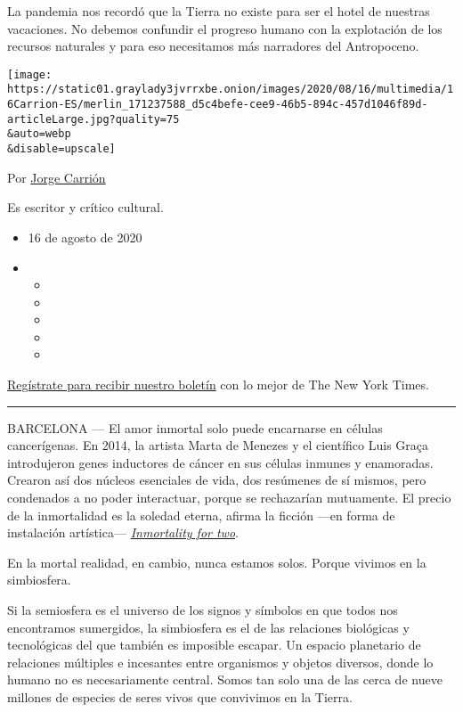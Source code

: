 La pandemia nos recordó que la Tierra no existe para ser el hotel de
nuestras vacaciones. No debemos confundir el progreso humano con la
explotación de los recursos naturales y para eso necesitamos más
narradores del Antropoceno.

\texttt{[image: https://static01.graylady3jvrrxbe.onion/images/2020/08/16/multimedia/16Carrion-ES/merlin\_171237588\_d5c4befe-cee9-46b5-894c-457d1046f89d-articleLarge.jpg?quality=75\\\&auto=webp\\\&disable=upscale]}

Por \href{https://www.nytimes3xbfgragh.onion/by/jorge-carrion}{Jorge
Carrión}

Es escritor y crítico cultural.

\begin{itemize}
\item
  16 de agosto de 2020
\item
  \begin{itemize}
  \item
  \item
  \item
  \item
  \item
  \end{itemize}
\end{itemize}

\href{https://www.nytimes3xbfgragh.onion/newsletters/el-times}{Regístrate
para recibir nuestro boletín} con lo mejor de The New York Times.

\begin{center}\rule{0.5\linewidth}{\linethickness}\end{center}

BARCELONA --- El amor inmortal solo puede encarnarse en células
cancerígenas. En 2014, la artista Marta de Menezes y el científico Luis
Graça introdujeron genes inductores de cáncer en sus células inmunes y
enamoradas. Crearon así dos núcleos esenciales de vida, dos resúmenes de
sí mismos, pero condenados a no poder interactuar, porque se rechazarían
mutuamente. El precio de la inmortalidad es la soledad eterna, afirma la
ficción ---en forma de instalación artística---
\href{https://martademenezes.com/portfolio/immortality-for-two/}{\emph{Inmortality
for two}}.

En la mortal realidad, en cambio, nunca estamos solos. Porque vivimos en
la simbiosfera.

Si la semiosfera es el universo de los signos y símbolos en que todos
nos encontramos sumergidos, la simbiosfera es el de las relaciones
biológicas y tecnológicas del que también es imposible escapar. Un
espacio planetario de relaciones múltiples e incesantes entre organismos
y objetos diversos, donde lo humano no es necesariamente central. Somos
tan solo una de las cerca de nueve millones de especies de seres vivos
que convivimos en la Tierra.

